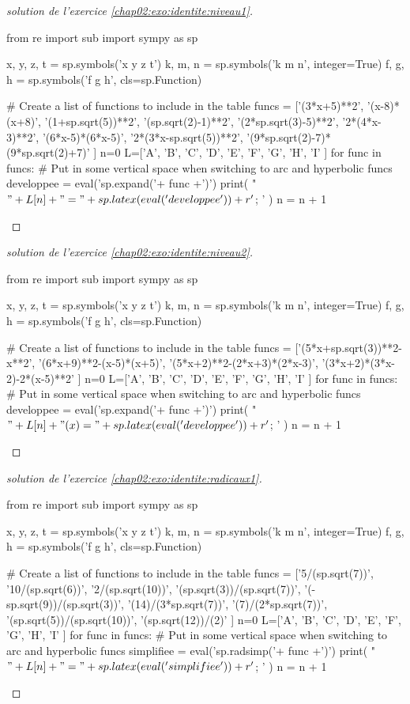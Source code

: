 \vfill 
\begin{proof}[solution de l'exercice \ref{chap02:exo:identite:niveau1}]
\begin{pycode}
from re import sub
import sympy as sp

x, y, z, t = sp.symbols('x y z t')
k, m, n = sp.symbols('k m n', integer=True)
f, g, h = sp.symbols('f g h', cls=sp.Function)

# Create a list of functions to include in the table
funcs = ['(3*x+5)**2',
'(x-8)*(x+8)',
'(1+sp.sqrt(5))**2',
'(sp.sqrt(2)-1)**2',
'(2*sp.sqrt(3)-5)**2',
'2*(4*x-3)**2',
'(6*x-5)*(6*x-5)',
'2*(3*x-sp.sqrt(5))**2',
'(9*sp.sqrt(2)-7)*(9*sp.sqrt(2)+7)'
]
n=0
L=['A', 'B', 'C', 'D', 'E', 'F', 'G', 'H', 'I'  ]
for func in funcs:
	# Put in some vertical space when switching to arc and hyperbolic funcs 
	developpee =  eval('sp.expand('+ func +')') 
	print( "$"+L[n] + "=" + sp.latex( eval('developpee') )  + r'$; ' ) 
	n     = n + 1 
\end{pycode}
\end{proof}
\begin{proof}[solution de l'exercice \ref{chap02:exo:identite:niveau2}]
\begin{pycode}
from re import sub
import sympy as sp

x, y, z, t = sp.symbols('x y z t')
k, m, n = sp.symbols('k m n', integer=True)
f, g, h = sp.symbols('f g h', cls=sp.Function)

# Create a list of functions to include in the table
funcs = ['(5*x+sp.sqrt(3))**2-x**2',
'(6*x+9)**2-(x-5)*(x+5)',
'(5*x+2)**2-(2*x+3)*(2*x-3)',
'(3*x+2)*(3*x-2)-2*(x-5)**2' 
]
n=0
L=['A', 'B', 'C', 'D', 'E', 'F', 'G', 'H', 'I'  ]
for func in funcs:
	# Put in some vertical space when switching to arc and hyperbolic funcs 
	developpee =  eval('sp.expand('+ func +')') 
	print( "$"+L[n] + "(x) =" + sp.latex( eval('developpee') )  + r'$; ' ) 
	n     = n + 1 
\end{pycode}
\end{proof}
\begin{proof}[solution de l'exercice \ref{chap02:exo:identite:radicaux1}]
\begin{pycode}
from re import sub
import sympy as sp

x, y, z, t = sp.symbols('x y z t')
k, m, n = sp.symbols('k m n', integer=True)
f, g, h = sp.symbols('f g h', cls=sp.Function)

# Create a list of functions to include in the table
funcs = ['5/(sp.sqrt(7))',
'10/(sp.sqrt(6))',
'2/(sp.sqrt(10))',
'(sp.sqrt(3))/(sp.sqrt(7))',
'(-sp.sqrt(9))/(sp.sqrt(3))',
'(14)/(3*sp.sqrt(7))',
'(7)/(2*sp.sqrt(7))',
'(sp.sqrt(5))/(sp.sqrt(10))',
'(sp.sqrt(12))/(2)'
]
n=0
L=['A', 'B', 'C', 'D', 'E', 'F', 'G', 'H', 'I'  ]
for func in funcs:
	# Put in some vertical space when switching to arc and hyperbolic funcs
	simplifiee =  eval('sp.radsimp('+ func +')')
	print( "$"+L[n] + " =" + sp.latex( eval('simplifiee') )  + r'$; ' )
	n     = n + 1
\end{pycode}
\end{proof}	
